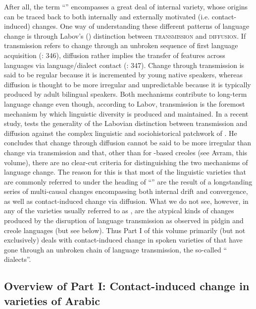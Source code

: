 \documentclass[output=paper]{langsci/langscibook}
\begin{document}
After all, the term ``'' encompasses a great deal of internal variety, whose origins can be traced back to both internally and externally motivated (i.e. con\-tact-induced) changes. One way of understanding these different patterns of {language change} is through Labov's (\citeyear{Labov2007}) distinction between \textsc{transmission} and \textsc{diffusion}. If {transmission} refers to change through an unbroken sequence of first language acquisition (\citealt{Labov2007}: 346), {diffusion} rather implies the {transfer} of features across languages via language/{dialect contact} (\citealt{Labov2007}: 347). Change through {transmission} is said to be regular because it is incremented by young native speakers, whereas {diffusion} is thought to be more irregular and unpredictable because it is typically produced by adult bilingual speakers. Both mechanisms contribute to long-term {language change} even though, according to Labov, {transmission} is the foremost mechanism by which linguistic diversity is produced and maintained. In a recent study, \citet{Owens2018} tests the generality of the Labovian distinction between {transmission} and {diffusion} against the complex linguistic and sociohistorical patchwork of . He concludes that change through {diffusion} cannot be said to be more irregular than change via {transmission} and that, other than for -based creoles (see Avram, this volume), there are no clear-cut criteria for distinguishing the two mechanisms of {language change}. The reason for this is that most of the linguistic varieties that are commonly referred to under the heading of ``'' are the result of a longstanding series of multi-causal changes encompassing both internal drift and {convergence}, as well as contact-induced change via {diffusion}. What we do not see, however, in any of the varieties usually referred to as , are the atypical kinds of changes produced by the disruption of language {transmission} as observed in {pidgin} and {creole} languages (but see below). Thus Part I of this volume primarily (but not exclusively) deals with contact-induced change in spoken varieties of  that have gone through an unbroken chain of language {transmission}, the so-called `` dialects''.


\subsection{Overview of Part I: Contact-induced change in varieties of Arabic}\label{intropartIoverview}
\end{document}
